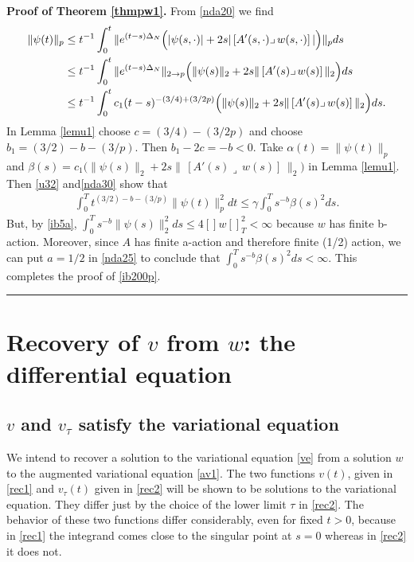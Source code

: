 \documentclass[12pt]{article}
\newenvironment{proof}[1][Proof]{\textbf{#1.} }{\ \rule{0.5em}{0.5em}}
\def \nn{[]}
\def \eref{\eqref}
\def \lrc{\lrcorner\,}
\numberwithin{equation}{section}
\begin{document}
   
\bigskip
\noindent
     \begin{proof}[Proof of Theorem \ref{thmpw1}]
     From \eref{nda20} we find 
     \begin{align}
     \|\psi(t)\|_p &\le t^{-1}\int_0^t \|e^{(t-s) \Delta_N} \Big( |\psi(s, \cdot)| 
                       + 2s |\, [A'(s, \cdot) \lrc w(s, \cdot)]\, | \Big) \|_p ds      \notag\\
  & \le   t^{-1}\int_0^t \|e^{(t-s) \Delta_N}\|_{2\rightarrow p} \Big( \|\psi(s)\|_2 
                       + 2s \| \, [A'(s) \lrc w(s)]\, \|_2 \Big) ds    \notag\\
  & \le   t^{-1}\int_0^t c_1(t-s)^{-(3/4) + (3/2p)} \Big( \|\psi(s)\|_2 
                       + 2s \| \, [A'(s) \lrc w(s)]\, \|_2 \Big) ds.  \label{nda30}
     \end{align}
 In Lemma \ref{lemu1}    choose  $c = (3/4) -(3/2p)$ and choose 
     $b_1 = (3/2)-b -(3/p)$. Then $b_1 - 2c =  -b <0$. Take $\alpha(t) = \| \psi(t)\|_p$ and
     $\beta(s) = c_1\Big( \|\psi(s)\|_2  + 2s \| \, [A'(s) \lrc w(s)]\, \|_2 \Big)$ in Lemma \ref{lemu1}. 
     Then  \eref{u32}  and\eref{nda30}       show that
     \begin{align}
     \int_0^T t^{(3/2) - b - (3/p)} \|\psi(t)\|_p^2 dt \le \gamma \int_0^T s^{-b} \beta(s)^2 ds.
     \end{align}
     But, by \eref{ib5a},  $\int_0^T s^{-b}\| \psi(s)\|_2^2 ds \le 4\nn w \nn_T^2 < \infty$ because $w$ has finite b-action. 
     Moreover, since $A$ has finite a-action and therefore finite (1/2) action, we can
      put $a = 1/2$ in \eref{nda25} to conclude that
     $\int_0^T s^{-b} \beta(s)^2 ds < \infty$. This completes the proof of \eref{ib200p}.
\end{proof}





\section{Recovery of $v$ from $w$: the differential equation}     \label{secrec}

\subsection{$v$ and $v_\tau$ satisfy the variational equation}

We intend to recover a solution to the variational equation \eref{ve}  from a  solution
 $w$ to the augmented variational equation \eref{av1}. 
 The two  functions 
 $v(t)$, given in   \eref{rec1} and $v_\tau(t)$ given in \eref{rec2} will be shown to be solutions
  to the variational equation.  
 They differ just by the choice of the lower limit $\tau$ in \eref{rec2}. The behavior   
   of these two functions differ considerably, even for fixed $t >0$,   
   because in \eref{rec1} the integrand comes close
   to the singular point at $s = 0$ whereas in \eref{rec2} it    does not.  
\end{document}
